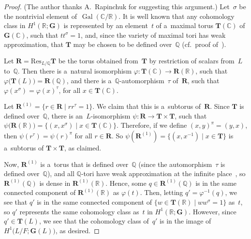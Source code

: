 \documentclass[10pt,a4paper]{amsart}
\DeclareMathOperator{\Gal}{Gal}
\numberwithin{equation}{section}
\begin{document}
\begin{proof}(The author thanks A.~Rapinchuk for suggesting this argument.) Let~$\sigma$ be the nontrivial element of~$\Gal(\mathbb{C}/\mathbb{R})$.
It is well known that any cohomology class in $H^1(\mathbb{R}; \mathbf{G})$ is represented by an element~$t$ of
a~maximal torus $\mathbf{T}(\mathbb{C})$ of $\mathbf{G}(\mathbb{C})$, such that $t t^\sigma = 1$, and, since the variety
of maximal tori has weak approximation, that $\mathbf{T}$ may be chosen to be def\/ined over~$\mathbb{Q}$ (cf.\ proof
of~\cite[Proposition~6.17, p.~337]{PlatonovRapinchukBook}).

Let $\mathbf{R} = \mathrm{Res}_{L/\mathbb{Q}} \mathbf{T}$ be the torus obtained from~$\mathbf{T}$ by restriction of
scalars from~$L$ to~$\mathbb{Q}$.
Then there is a~natural isomorphism $\varphi \colon \mathbf{T}(\mathbb{C}) \to \mathbf{R}(\mathbb{R})$, such that
$\varphi \bigl(\mathbf{T}(L) \bigr) = \mathbf{R}(\mathbb{Q})$, and there is a~$\mathbb{Q}$-automorphism~$\tau$
of~$\mathbf{R}$, such that $\varphi(x^\sigma) = \varphi(x)^\tau$, for all $x \in \mathbf{T}(\mathbb{C})$.

Let $\mathbf{R}^{(1)} = \{ r \in \mathbf{R} \mid r r^\tau = 1 \}$.
We claim that this is a~subtorus of~$\mathbf{R}$.
Since $\mathbf{T}$ is def\/ined over~$\mathbb{Q}$, there is an~$L$-isomorphism $\psi \colon \mathbf{R} \to \mathbf{T}
\times \mathbf{T}$, such that $\psi \bigl(\mathbf{R}(\mathbb{R}) \bigr) = \{ (x, x^\sigma) \mid x \in
\mathbf{T}(\mathbb{C}) \}$.
Therefore, if we def\/ine $(x,y)^\pi = (y,x)$, then $\psi(r^\tau) = \psi(r)^\pi$ for all $r \in \mathbf{R}$.
So $\psi(\mathbf{R}^{(1)}) = \{ (x, x^{-1}) \mid x \in \mathbf{T} \}$ is a~subtorus of $\mathbf{T} \times \mathbf{T}$,
as claimed.

Now, $\mathbf{R}^{(1)}$ is a~torus that is def\/ined over~$\mathbb{Q}$ (since the automorphism~$\tau$ is def\/ined
over~$\mathbb{Q}$), and all $\mathbb{Q}$-tori have weak approximation at the inf\/inite place~\cite[Corollary~1 of Proposition~7.8,
p.~418]{PlatonovRapinchukBook}, so $\mathbf{R}^{(1)}(\mathbb{Q})$ is dense in $\mathbf{R}^{(1)}(\mathbb{R})$.
Hence, some $q \in \mathbf{R}^{(1)}(\mathbb{Q})$ is in the same connected component of $\mathbf{R}^{(1)}(\mathbb{R})$ as
$\varphi(t)$.
Then, letting $q' = \varphi^{-1}(q)$, we see that $q'$ is in the same connected component of $\{ w \in
\mathbf{T}(\mathbb{R}) \mid w w^\sigma = 1 \}$ as~$t$, so $q'$ represents the same cohomology class as~$t$ in
$H^1(\mathbb{R}; \mathbf{G})$.
However, since $q' \in \mathbf{T}(L)$, we see that the cohomology class of~$q'$ is in the image of $H^1 \bigl(L/F;
\mathbf{G}(L) \bigr)$, as desired.
\end{proof}
\end{document}
